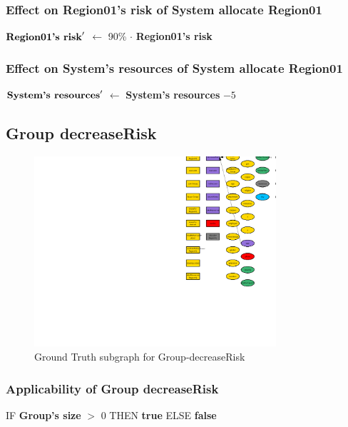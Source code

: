 \documentclass{article}%
\begin{document}
%
\subsubsection{Effect on Region01's risk of System allocate Region01}%
\label{ssubsec:Effect on Region01's risk of System allocate Region01}%
\begin{flushleft}%
$\mbox{\textbf{Region01's risk}} '$%
$\leftarrow$%
90\%%
$\cdot$%
\textbf{Region01's risk}%
\end{flushleft}

%
\subsubsection{Effect on System's resources of System allocate Region01}%
\label{ssubsec:Effect on System's resources of System allocate Region01}%
\begin{flushleft}%
$\mbox{\textbf{System's resources}} '$%
$\leftarrow$%
\textbf{System's resources}%
${-}5$%
\end{flushleft}

%
\subsection{Group decreaseRisk}%
\label{subsec:Group decreaseRisk}%


\begin{figure}[ht]%
\centering%
\includegraphics[width=0.8\textwidth]{images/Group-decreaseRisk.png}%
\caption{Ground Truth subgraph for Group{-}decreaseRisk}%
\end{figure}

%
\subsubsection{Applicability of Group decreaseRisk}%
\label{ssubsec:Applicability of Group decreaseRisk}%
\begin{flushleft}%
IF %
\textbf{Group's size}%
$>$%
0%
\linebreak%
\hspace*{2em}%
THEN %
\textbf{true}%
\linebreak%
\hspace*{2em}%
ELSE %
\textbf{false}%
\end{flushleft}
\end{document}
